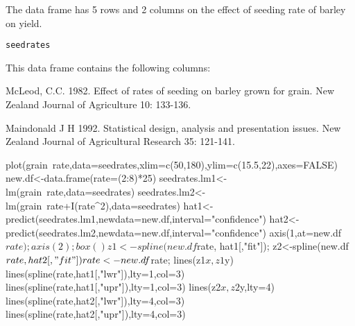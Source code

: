 \begin{Description}\relax
The  data frame has 5 rows and 2 columns on 
the effect of seeding rate of barley on yield.
\end{Description}
\begin{Usage}
\begin{verbatim}seedrates\end{verbatim}
\end{Usage}
\begin{Format}\relax
This data frame contains the following columns:
\end{Format}
\begin{Source}\relax
McLeod, C.C. 1982.
Effect of rates of seeding on barley grown for grain. New Zealand 
Journal of Agriculture 10: 133-136.
\end{Source}
\begin{References}\relax
Maindonald J H 1992. Statistical design, analysis and presentation
issues. New Zealand Journal of Agricultural Research 35: 121-141.
\end{References}
\begin{Examples}
\begin{ExampleCode}
plot(grain~rate,data=seedrates,xlim=c(50,180),ylim=c(15.5,22),axes=FALSE)
new.df<-data.frame(rate=(2:8)*25)
seedrates.lm1<-lm(grain~rate,data=seedrates)
seedrates.lm2<-lm(grain~rate+I(rate^2),data=seedrates)
hat1<-predict(seedrates.lm1,newdata=new.df,interval="confidence")
hat2<-predict(seedrates.lm2,newdata=new.df,interval="confidence")
axis(1,at=new.df$rate); axis(2); box()
z1<-spline(new.df$rate, hat1[,"fit"]); z2<-spline(new.df$rate,   
hat2[,"fit"])
rate<-new.df$rate; lines(z1$x,z1$y)
lines(spline(rate,hat1[,"lwr"]),lty=1,col=3)
lines(spline(rate,hat1[,"upr"]),lty=1,col=3)
lines(z2$x,z2$y,lty=4)
lines(spline(rate,hat2[,"lwr"]),lty=4,col=3)
lines(spline(rate,hat2[,"upr"]),lty=4,col=3)\end{ExampleCode}
\end{Examples}

